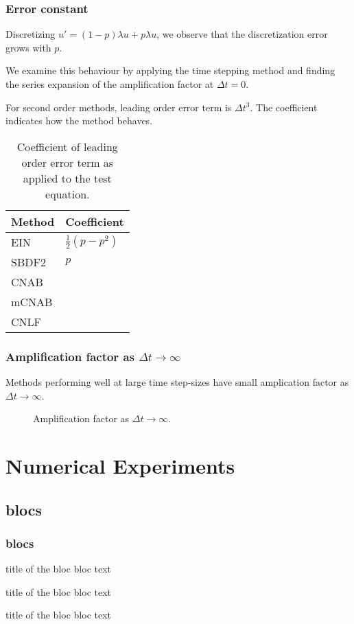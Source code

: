 \documentclass[hyperref={pdfpagelabels=false}]{beamer}
\begin{document}
\begin{frame}
	\frametitle{Error constant}
	Discretizing $u' = (1- p)\lambda u + p\lambda u$, we observe that the discretization error grows with $p$.
	
	We examine this behaviour by applying the time stepping method and finding the series expansion of the amplification factor at $\Delta t=0$. 
	
	For second order methods, leading order error term is $\Delta t^3$. The coefficient indicates how the method behaves. 
	\begin{table}[b]
		\centering 
		\caption{Coefficient of leading order error term as applied to the test equation.}
		\begin{tabular}{ll} 
			\toprule 
	Method & Coefficient 
\\ \midrule 
EIN & $\frac{1}{2}(p-p^2)$ 
\\
SBDF2 & $p$
\\ 
CNAB 
\\ 
mCNAB 
\\ 
CNLF 
\\ \bottomrule
		\end{tabular}
	\end{table}
\end{frame}
\begin{frame}
	\frametitle{Amplification factor as $\Delta t\to\infty$}
	Methods performing well at large time step-sizes have small amplication factor as $\Delta t \to \infty$. 
	
	\begin{figure}
		\centering 
\caption{Amplification factor as $\Delta t \to \infty$.}
	\end{figure}
\end{frame}

\section{Numerical Experiments}
\subsection{blocs}
\begin{frame}
\frametitle{blocs}

\begin{block}{title of the bloc}
bloc text
\end{block}

\begin{exampleblock}{title of the bloc}
bloc text
\end{exampleblock}


\begin{alertblock}{title of the bloc}
bloc text
\end{alertblock}
\end{frame}
\end{document}
